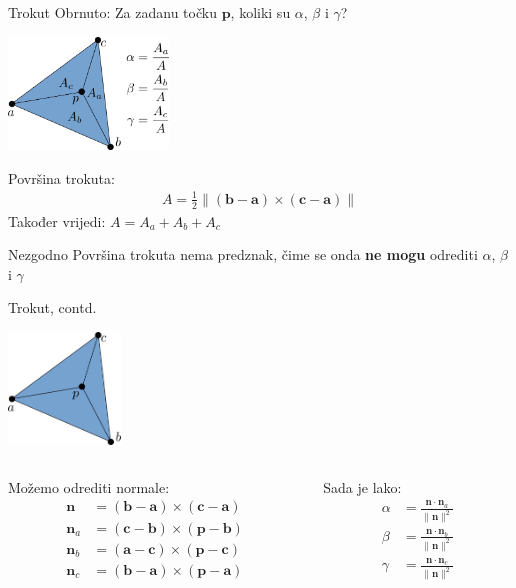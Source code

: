 \documentclass[9pt]{beamer}
\begin{document}
\begin{frame}{Trokut}
	Obrnuto: Za zadanu točku  $\mathbf{p}$, koliki su $\alpha$, $\beta$ i  $\gamma$?
	\begin{center}
		\includegraphics[height=3cm]{./slike/2d_trokut_01.png}
	\end{center}
	Površina trokuta: 
	\begin{align*}
	A = \frac{1}{2}\lVert (\mathbf{b} - \mathbf{a}) \times (\mathbf{c} - \mathbf{a})\rVert
	\end{align*}
	Također vrijedi: $A = A_a + A_b + A_c$ \\
	
	\begin{block}{Nezgodno}
		Površina trokuta nema predznak, čime se onda \textbf{ne mogu} odrediti $\alpha$, $\beta$ i  $\gamma$
	\end{block}
\end{frame}

\begin{frame}{Trokut, contd.}
	\begin{center}
		\includegraphics[height=3cm]{./slike/2d_trokut_02.png}
	\end{center}
\begin{columns}[t]
	\begin{column}{0.45 \textwidth}
		Možemo odrediti normale:
		\begin{align*}
		\mathbf{n} & = (\mathbf{b} - \mathbf{a}) \times (\mathbf{c} - \mathbf{a}) \\
		\mathbf{n}_a & = (\mathbf{c} - \mathbf{b}) \times (\mathbf{p} - \mathbf{b}) \\
		\mathbf{n}_b & = (\mathbf{a} - \mathbf{c}) \times (\mathbf{p} - \mathbf{c}) \\
		\mathbf{n}_c & = (\mathbf{b} - \mathbf{a}) \times (\mathbf{p} - \mathbf{a})
		\end{align*}
	\end{column}
\begin{column}{0.45 \textwidth}
	Sada je lako:
	\begin{align*}
		\alpha & = \frac{\mathbf{n} \cdot \mathbf{n}_a}{\lVert \mathbf{n} \rVert ^2} \\
		\beta & = \frac{\mathbf{n} \cdot \mathbf{n}_b}{\lVert \mathbf{n} \rVert ^2} \\
		\gamma & = \frac{\mathbf{n} \cdot \mathbf{n}_c}{\lVert \mathbf{n} \rVert ^2}
	\end{align*}
\end{column}
\end{columns}
\end{frame}
\end{document}
